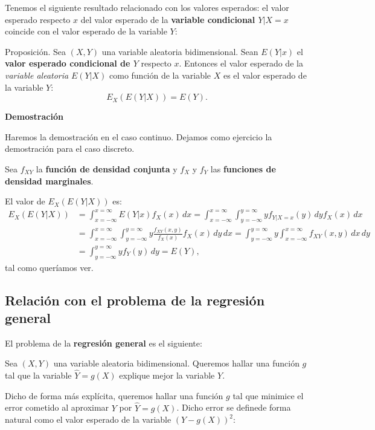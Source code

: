 \documentclass[
  letterpaper,
  DIV=11,
  numbers=noendperiod]{scrreprt}
\begin{document}
Tenemos el siguiente resultado relacionado con los valores esperados: el
valor esperado respecto \(x\) del valor esperado de la \textbf{variable
condicional \(Y|X=x\)} coincide con el valor esperado de la variable
\(Y\):

Proposición. Sea \((X,Y)\) una variable aleatoria bidimensional. Sean
\(E(Y|x)\) el \textbf{valor esperado condicional de \(Y\)} respecto
\(x\). Entonces el valor esperado de la \emph{variable aleatoria}
\(E(Y|X)\) como función de la variable \(X\) es el valor esperado de la
variable \(Y\): \[
E_X(E(Y|X))=E(Y).
\]

\textbf{Demostración}

Haremos la demostración en el caso continuo. Dejamos como ejercicio la
demostración para el caso discreto.

Sea \(f_{XY}\) la \textbf{función de densidad conjunta} y \(f_X\) y
\(f_Y\) las \textbf{funciones de densidad marginales}.

El valor de \(E_X(E(Y|X))\) es: \[
\begin{array}{rl}
E_X(E(Y|X)) & =\int_{x=-\infty}^{x=\infty} E(Y|x)f_X(x)\, dx=\int_{x=-\infty}^{x=\infty}\int_{y=-\infty}^{y=\infty} y f_{Y|X=x}(y)\, dy f_X(x)\, dx \\ & = \int_{x=-\infty}^{x=\infty}\int_{y=-\infty}^{y=\infty} y \frac{f_{XY}(x,y)}{f_X(x)}f_X(x)\, dy\, dx = \int_{y=-\infty}^{y=\infty} y \int_{x=-\infty}^{x=\infty}f_{XY}(x,y)\, dx\, dy \\ &  = \int_{y=-\infty}^{y=\infty} y f_Y(y)\, dy = E(Y),
\end{array}
\] tal como queríamos ver.

\hypertarget{relaciuxf3n-con-el-problema-de-la-regresiuxf3n-general}{%
\subsection{Relación con el problema de la regresión
general}\label{relaciuxf3n-con-el-problema-de-la-regresiuxf3n-general}}

El problema de la \textbf{regresión general} es el siguiente:

Sea \((X,Y)\) una variable aleatoria bidimensional. Queremos hallar una
función \(g\) tal que la variable \(\hat{Y}=g(X)\) explique mejor la
variable \(Y\).

Dicho de forma más explícita, queremos hallar una función \(g\) tal que
minimice el error cometido al aproximar \(Y\) por \(\hat{Y}=g(X)\).
Dicho error se definede forma natural como el valor esperado de la
variable \((Y-g(X))^2\):
\end{document}
